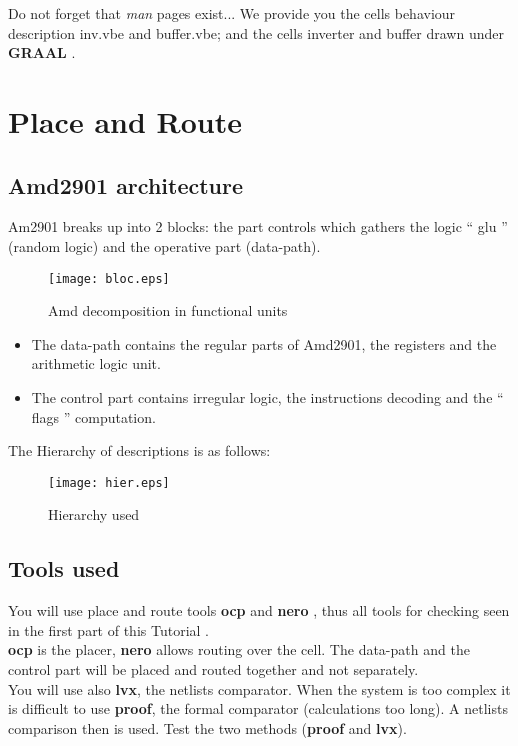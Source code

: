\documentclass{article}
\begin{document}
Do not forget that { \it man } pages exist...
We provide you the cells behaviour description inv.vbe and buffer.vbe;
and the cells inverter and buffer drawn under { \bf GRAAL }.


\section{Place and Route}

\subsection{Amd2901 architecture}

Am2901 breaks up into 2 blocks: the part controls which gathers
the logic `` glu '' (random logic) and the operative part (data-path).

\begin{figure}[H]\centering
  \texttt{[image: bloc.eps]}
  \caption{Amd decomposition in functional units}
  \label{Fig:decomposition}
\end{figure}


\begin{itemize}\itemsep=-.4ex
\item The data-path contains the regular parts of Amd2901, the registers
     and the arithmetic logic unit.
\item The control part contains irregular logic, 
    the instructions decoding and the `` flags '' computation.
\end{itemize}

The Hierarchy of descriptions is as follows:
\begin{figure}[H]\centering
  \texttt{[image: hier.eps]}
  \caption{Hierarchy used}
  \label{Fig:hierarchie}
\end{figure}

\subsection{Tools used}

You will use place and route tools { \bf ocp } and {\bf nero },
thus all tools for checking seen in the first part of this Tutorial .\\
{\bf ocp} is the placer, {\bf nero} allows routing over the cell.
The data-path and the control part will be placed and routed together and not separately. \\
You will use also {\bf lvx}, the netlists comparator. When the
system is too complex it is difficult to use {\bf proof}, the
formal comparator (calculations too long). A netlists comparison 
then is used. Test the two methods ({\bf proof} and {\bf
lvx}).
\end{document}
